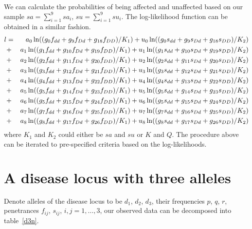 We can calculate the probabilities of being affected and unaffected based on
our sample $sa=\sum_{i=1}^9 sa_i$, $su=\sum_{i=1}^9 su_i$.
The log-likelihood function can be obtained in a similar fashion.
\begin{eqnarray*}
l&=&  a_0 \ln ((g_0  f_{dd}+g_{9}  f_{Dd}+g_{18} f_{DD})/K_1)
  +   u_0 \ln ((g_0  s_{dd}+g_{9}  s_{Dd}+g_{18} s_{DD})/K_2) \cr
 &+&  a_1 \ln ((g_1  f_{dd}+g_{10} f_{Dd}+g_{19} f_{DD})/K_1)
  +   u_1 \ln ((g_1  s_{dd}+g_{10} s_{Dd}+g_{19} s_{DD})/K_2) \cr
 &+&  a_2 \ln ((g_2  f_{dd}+g_{11} f_{Dd}+g_{20} f_{DD})/K_1)
  +   u_2 \ln ((g_2  s_{dd}+g_{11} s_{Dd}+g_{20} s_{DD})/K_2) \cr
 &+&  a_3 \ln ((g_3  f_{dd}+g_{12} f_{Dd}+g_{21} f_{DD})/K_1)
  +   u_3 \ln ((g_3  s_{dd}+g_{12} s_{Dd}+g_{21} s_{DD})/K_2) \cr
 &+&  a_4 \ln ((g_4  f_{dd}+g_{13} f_{Dd}+g_{22} f_{DD})/K_1)
  +   u_4 \ln ((g_4  s_{dd}+g_{13} s_{Dd}+g_{22} s_{DD})/K_2) \cr
 &+&  a_5 \ln ((g_5  f_{dd}+g_{14} f_{Dd}+g_{23} f_{DD})/K_1)
  +   u_5 \ln ((g_5  s_{dd}+g_{14} s_{Dd}+g_{23} s_{DD})/K_2) \cr
 &+&  a_6 \ln ((g_5  f_{dd}+g_{15} f_{Dd}+g_{24} f_{DD})/K_1)
  +   u_6 \ln ((g_5  s_{dd}+g_{15} s_{Dd}+g_{24} s_{DD})/K_2) \cr
 &+&  a_7 \ln ((g_7  f_{dd}+g_{16} f_{Dd}+g_{25} f_{DD})/K_1)
  +   u_7 \ln ((g_7  s_{dd}+g_{16} s_{Dd}+g_{25} s_{DD})/K_2) \cr
 &+&  a_8 \ln ((g_8  f_{dd}+g_{17} f_{Dd}+g_{26} f_{DD})/K_1)
  +   u_8 \ln ((g_8  s_{dd}+g_{17} s_{Dd}+g_{26} s_{DD})/K_2)
\end{eqnarray*}
where $K_1$ and $K_2$ could either be $sa$ and $su$ or $K$ and $Q$.  The
procedure above can be iterated to pre-specified criteria based on the
log-likelihoods.


\section*{A disease locus with three alleles}

Denote alleles of the disease locus to be $d_1$, $d_2$, $d_3$, their
frequencies $p$, $q$, $r$, penetrances $f_{ij}$, $s_{ij}$, $i,j=1,\ldots,3$,
our observed data can be decomposed into table~\ref{d3n}.

